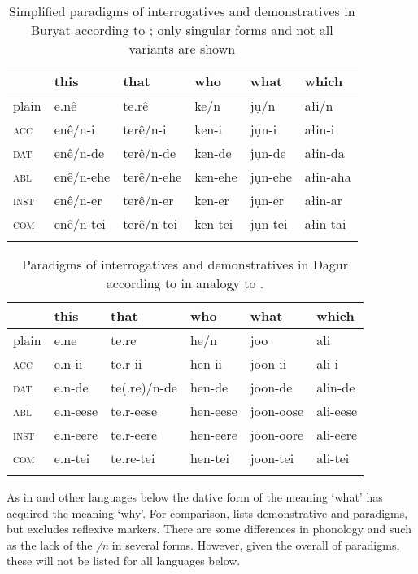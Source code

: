 \begin{table}
\caption{Simplified paradigms of interrogatives and demonstratives in Buryat according to \cite[31ff.]{Castrén1857a}; only singular forms and not all variants are shown}
\label{tab:mong:19}

\begin{tabularx}{\textwidth}{XXXXXl}
\lsptoprule
& \textbf{this} & \textbf{that} & \textbf{who} & \textbf{what} & \textbf{which}\\
\midrule
plain & e.nê & te.rê & ke/n & jụ/n & ałi/n\\
\textsc{acc} & enê/n-i & terê/n-i & ken-i & jụn-i & ałin-i\\
\textsc{dat} & enê/n-de & terê/n-de & ken-de & jụn-de & ałin-da\\
\textsc{abl} & enê/n-ehe & terê/n-ehe & ken-ehe & jụn-ehe & ałin-aha\\
\textsc{inst} & enê/n-er & terê/n-er & ken-er & jụn-er & ałin-ar\\
\textsc{com} & enê/n-tei & terê/n-tei & ken-tei & jụn-tei & ałin-tai\\
\lspbottomrule
\end{tabularx}
\end{table}

\begin{table}
\caption{Paradigms of interrogatives and demonstratives in Dagur according to \cite[28ff.]{Martin1961} in analogy to .}
\label{tab:mong:20}

\begin{tabularx}{\textwidth}{XXlXXl}
\lsptoprule
& \textbf{this} & \textbf{that} & \textbf{who} & \textbf{what} & \textbf{which}\\
\midrule
plain & e.ne & te.re & he/n & joo & ali\\
\textsc{acc} & e.n-ii & te.r-ii & hen-ii & joon-ii & ali-i\\
\textsc{dat} & e.n-de & te(.re)/n-de & hen-de & joon-de & alin-de\\
\textsc{abl} & e.n-eese & te.r-eese & hen-eese & joon-oose & ali-eese\\
\textsc{inst} & e.n-eere & te.r-eere & hen-eere & joon-oore & ali-eere\\
\textsc{com} & e.n-tei & te.re-tei & hen-tei & joon-tei & ali-tei\\
\lspbottomrule
\end{tabularx}
\end{table}

As in  and other languages below the dative  form of the  meaning ‘what’ has acquired the meaning ‘why’. For comparison,  lists  demonstrative and  paradigms, but excludes reflexive  markers. There are some differences in phonology and  such as the lack of the \textit{/n} in several  forms. However, given the overall  of paradigms, these will not be listed for all languages below.

